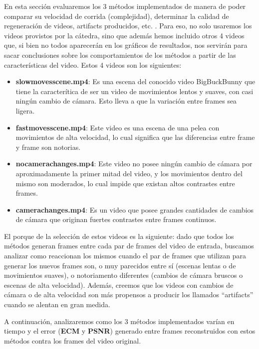 En esta secci\'on evaluaremos los 3 m\'etodos implementados de manera de poder comparar su velocidad de corrida (complejidad), determinar la calidad de regeneraci\'on de videos, artifacts producidos, etc. . Para eso, no solo usaremos los videos provistos por la c\'atedra, sino que adem\'as hemos incluido otros 4 videos que, si bien no todos aparecer\'an en los gr\'aficos de resultados, nos servir\'an para sacar conclusiones sobre los comportamientos de los m\'etodos a partir de las caracter\'isticas del video. Estos 4 videos son los siguientes:

\begin{itemize}
\item \textbf{slowmovesscene.mp4}: Es una escena del conocido video BigBuckBunny que tiene la caracter\'itica de ser un video de movimientos lentos y suaves, con casi ning\'un cambio de c\'amara. Esto lleva a que la variaci\'on entre frames sea ligera. 
\item \textbf{fastmovesscene.mp4}: Este video es una escena de una pelea con movimientos de alta velocidad, lo cual significa que las diferencias entre frame y frame son notorias.
\item \textbf{nocamerachanges.mp4}: Este video no posee ning\'un cambio de
c\'amara por aproximadamente la primer mitad del video, y los movimientos dentro
del mismo son moderados, lo cual impide que existan altos contrastes entre
frames.
\item \textbf{camerachanges.mp4}: Es un video que posee grandes cantidades de cambios de c\'amara que originan fuertes contrastes entre frames continuos.
\end{itemize}

El porque de la selecci\'on de estos videos es la siguiente: dado que todos los m\'etodos generan frames entre cada par de frames del video de entrada, buscamos analizar como reaccionan los mismos cuando el par de frames que utilizan para generar los nuevos frames son, o muy parecidos entre s\'i (escenas lentas o de movimientos suaves), o notoriamento diferentes (cambios de c\'amara bruscos o escenas de alta velocidad). Adem\'as, creemos que los videos con cambios de c\'amara o de alta velocidad son m\'as propensos a producir los llamados ``artifacts'' cuando se alentan en gran medida. 

A continuaci\'on, analizaremos como los 3 m\'etodos implementados var\'ian en tiempo y el error (\textbf{ECM} y \textbf{PSNR}) generado entre frames reconstruidos con estos m\'etodos contra los frames del video original.
